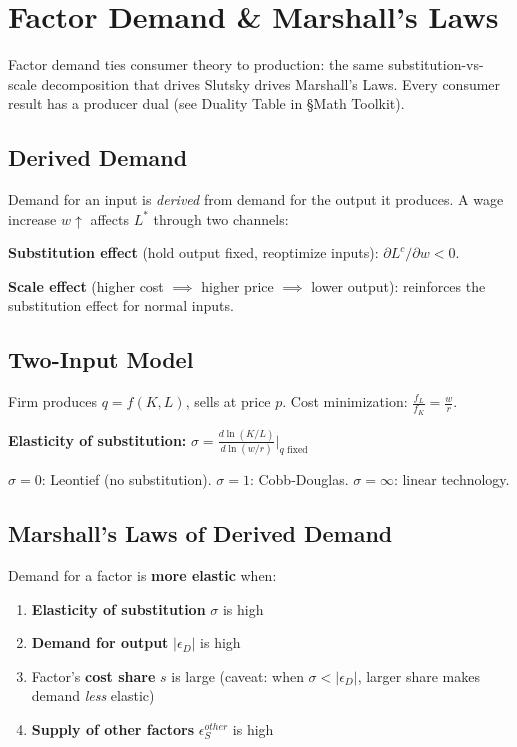 \section{Factor Demand \& Marshall's Laws}
Factor demand ties consumer theory to production: the same substitution-vs-scale decomposition that drives Slutsky drives Marshall's Laws. Every consumer result has a producer dual (see Duality Table in \S Math Toolkit).

\subsection{Derived Demand}
Demand for an input is \textit{derived} from demand for the output it produces. A wage increase $w \uparrow$ affects $L^*$ through two channels:

\textbf{Substitution effect} (hold output fixed, reoptimize inputs): $\partial L^c/\partial w < 0$.

\textbf{Scale effect} (higher cost $\implies$ higher price $\implies$ lower output): reinforces the substitution effect for normal inputs.

\subsection{Two-Input Model}
Firm produces $q = f(K,L)$, sells at price $p$. Cost minimization:
$\frac{f_L}{f_K} = \frac{w}{r}$.

\textbf{Elasticity of substitution:}
$\sigma = \frac{d\ln(K/L)}{d\ln(w/r)}\big|_{q\text{ fixed}}$

$\sigma = 0$: Leontief (no substitution). $\sigma = 1$: Cobb-Douglas. $\sigma = \infty$: linear technology.

\subsection{Marshall's Laws of Derived Demand}
Demand for a factor is \textbf{more elastic} when:
\begin{enumerate}[nosep]
    \item \textbf{Elasticity of substitution} $\sigma$ is high
    \item \textbf{Demand for output} $|\epsilon_D|$ is high
    \item Factor's \textbf{cost share} $s$ is large (caveat: when $\sigma < |\epsilon_D|$, larger share makes demand \textit{less} elastic)
    \item \textbf{Supply of other factors} $\epsilon_S^{other}$ is high
\end{enumerate}


